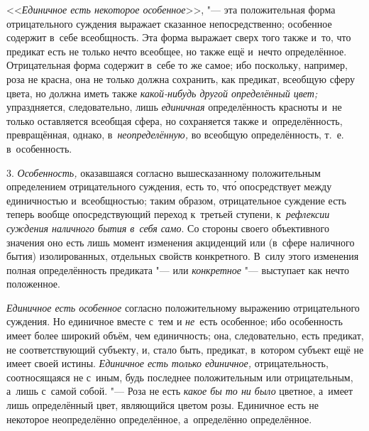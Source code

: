 <<{\em Единичное есть некоторое особенное}>>, "--- эта положительная форма
отрицательного суждения выражает сказанное непосредственно; особенное содержит
в~себе всеобщность. Эта форма выражает сверх того также и~то, что предикат есть
не только нечто всеобщее, но также ещё и~нечто определённое. Отрицательная
форма содержит в~себе то же самое; ибо поскольку, например, роза не красна, она
не только должна сохранить, как предикат, всеобщую сферу цвета, но должна иметь
также {\em какой-нибудь другой определённый цвет;} упраздняется, следовательно,
лишь {\em единичная} определённость красноты и~не только оставляется всеобщая
сфера, но сохраняется также и~определённость, превращённая, однако,
в~{\em неопределённую,} во всеобщую определённость, т.~е. в~особенность.

3. {\em Особенность,} оказавшаяся согласно вышесказанному положительным
определением отрицательного суждения, есть то, чт\'{о} опосредствует между
единичностью и~всеобщностью; таким образом, отрицательное суждение есть теперь
вообще опосредствующий переход к~третьей ступени, к~{\em рефлексии суждения
наличного бытия в~себя само}. Со стороны своего объективного значения оно есть
лишь момент изменения акциденций или (в~сфере наличного бытия) изолированных,
отдельных свойств конкретного. В~силу этого изменения полная определённость
предиката "--- или {\em конкретное} "--- выступает как нечто положенное.

{\em Единичное есть особенное} согласно положительному выражению
отрицательного суждения. Но единичное вместе с~тем и
{\em не}~есть особенное; ибо особенность имеет более широкий объём,
чем единичность; она, следовательно, есть предикат, не соответствующий
субъекту, и, стало быть, предикат, в~котором субъект ещё не имеет своей
истины. {\em Единичное есть только единичное,} отрицательность, соотносящаяся
не с~иным, будь последнее положительным или отрицательным, а~лишь с~самой
собой. "--- Роза не есть {\em какое бы то ни было} цветное, а~имеет лишь
определённый цвет, являющийся цветом розы. Единичное есть не некоторое
неопределённо определённое, а~определённо определённое.

